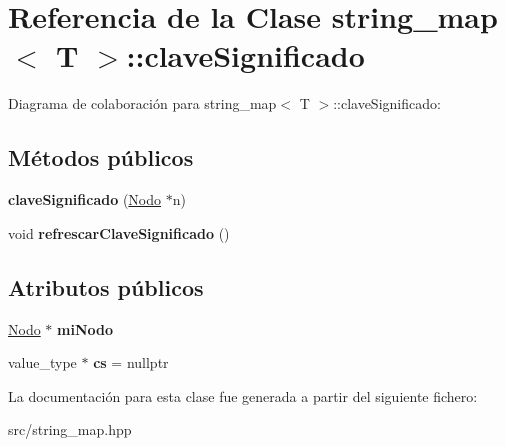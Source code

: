 \hypertarget{classstring__map_1_1claveSignificado}{\section{Referencia de la Clase string\+\_\+map$<$ T $>$\+:\+:clave\+Significado}
\label{classstring__map_1_1claveSignificado}
}


Diagrama de colaboración para string\+\_\+map$<$ T $>$\+:\+:clave\+Significado\+:
\subsection*{Métodos públicos}
\begin{DoxyCompactItemize}
\item 
\hypertarget{classstring__map_1_1claveSignificado_a0b83b00ec8d9bf4be00fbf8844b60d90}{{\bfseries clave\+Significado} (\hyperlink{structstring__map_1_1Nodo}{Nodo} $\ast$n)}\label{classstring__map_1_1claveSignificado_a0b83b00ec8d9bf4be00fbf8844b60d90}

\item 
\hypertarget{classstring__map_1_1claveSignificado_a16e143c7773a0d2b49b61b15c0432e4c}{void {\bfseries refrescar\+Clave\+Significado} ()}\label{classstring__map_1_1claveSignificado_a16e143c7773a0d2b49b61b15c0432e4c}

\end{DoxyCompactItemize}
\subsection*{Atributos públicos}
\begin{DoxyCompactItemize}
\item 
\hypertarget{classstring__map_1_1claveSignificado_a213c10e47016c3da581df72754822655}{\hyperlink{structstring__map_1_1Nodo}{Nodo} $\ast$ {\bfseries mi\+Nodo}}\label{classstring__map_1_1claveSignificado_a213c10e47016c3da581df72754822655}

\item 
\hypertarget{classstring__map_1_1claveSignificado_aff814d70c0c9b3998f296645ffcc9650}{value\+\_\+type $\ast$ {\bfseries cs} = nullptr}\label{classstring__map_1_1claveSignificado_aff814d70c0c9b3998f296645ffcc9650}

\end{DoxyCompactItemize}


La documentación para esta clase fue generada a partir del siguiente fichero\+:\begin{DoxyCompactItemize}
\item 
src/string\+\_\+map.\+hpp\end{DoxyCompactItemize}
